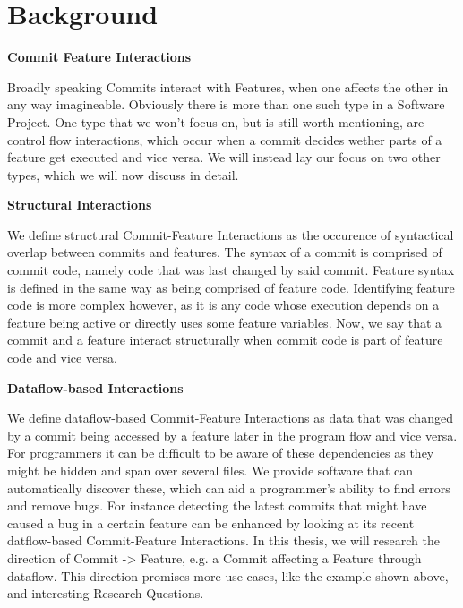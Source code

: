 \section*{Background}\label{ch:background}

\textbf{Commit Feature Interactions}

Broadly speaking Commits interact with Features, when one affects the other in any way imagineable.
Obviously there is more than one such type in a Software Project.
One type that we won't focus on, but is still worth mentioning, are control flow interactions, which occur when a commit decides wether parts of a feature get executed and vice versa.
We will instead lay our focus on two other types, which we will now discuss in detail.

\textbf{Structural Interactions} 

We define structural Commit-Feature Interactions as the occurence of syntactical overlap between commits and features.
The syntax of a commit is comprised of commit code, namely code that was last changed by said commit.
Feature syntax is defined in the same way as being comprised of feature code. 
Identifying feature code is more complex however, as it is any code whose execution depends on a feature being active or directly uses some feature variables. 
Now, we say that a commit and a feature interact structurally when commit code is part of feature code and vice versa. 

\textbf{Dataflow-based Interactions} 

We define dataflow-based Commit-Feature Interactions as data that was changed by a commit being accessed by a feature later in the program flow and vice versa.
For programmers it can be difficult to be aware of these dependencies as they might be hidden and span over several files.
We provide software that can automatically discover these, which can aid a programmer's ability to find errors and remove bugs.
For instance detecting the latest commits that might have caused a bug in a certain feature can be enhanced by looking at its recent datflow-based Commit-Feature Interactions.
In this thesis, we will research the direction of Commit -> Feature, e.g. a Commit affecting a Feature through dataflow.
This direction promises more use-cases, like the example shown above, and interesting Research Questions.
